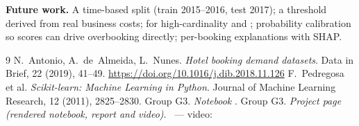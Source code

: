 \textbf{Future work.} A time-based split (train 2015–2016, test 2017); a threshold derived from real business costs;
 for high-cardinality  and ; probability calibration so scores can drive
overbooking directly; per-booking explanations with SHAP.

\begin{thebibliography}{9}
 N.~Antonio, A.~de~Almeida, L.~Nunes. \emph{Hotel booking demand datasets}. Data in Brief, 22 (2019),
  41--49. \url{https://doi.org/10.1016/j.dib.2018.11.126}
 F.~Pedregosa et al. \emph{Scikit-learn: Machine Learning in Python}. Journal of Machine Learning
  Research, 12 (2011), 2825--2830.
 Group G3. \emph{Notebook} . \TBNotebook
{} Group G3. \emph{Project page (rendered notebook, report and video)}. \TBPage\ — video: \TBVideo
\end{thebibliography}
